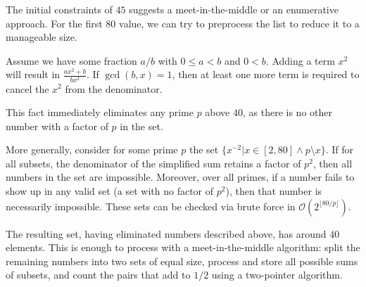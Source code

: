 \documentclass{article}
\begin{document}
The initial constraints of $45$ suggests a meet-in-the-middle or an enumerative approach. For the first $80$ value, we can try to preprocess the list to reduce it to a manageable size.

Assume we have some fraction $a/b$ with $0\leq a<b$ and $0<b$. Adding a term $x^2$ will result in $\frac{ax^2+b}{bx^2}$. If $\gcd(b,x)=1$, then at least one more term is required to cancel the $x^2$ from the denominator. 

This fact immediately eliminates any prime $p$ above $40$, as there is no other number with a factor of $p$ in the set. 

More generally, consider for some prime $p$ the set $\{x^{-2}|x\in[2,80]\land p\setminus x\}$. If for all subsets, the denominator of the simplified sum retains a factor of $p^2$, then all numbers in the set are impossible. Moreover, over all primes, if a number fails to show up in any valid set (a set with no factor of $p^2$), then that number is necessarily impossible. These sets can be checked via brute force in $\mathcal{O}(2^{\lfloor 80/p\rfloor})$. 

The resulting set, having eliminated numbers described above, has around $40$ elements. This is enough to process with a meet-in-the-middle algorithm: split the remaining numbers into two sets of equal size, process and store all possible sums of subsets, and count the pairs that add to $1/2$ using a two-pointer algorithm.
\end{document}
